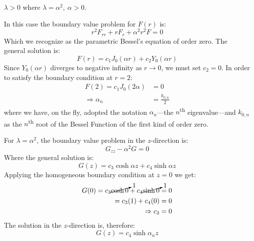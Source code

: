 \vspace{0.25cm}

\noindent\underline{$\lambda > 0 $} where $\lambda = \alpha^2, \ \alpha>0$.

\noindent In this case the boundary value problem for $F(r)$ is:
\begin{equation*}
r^2F_{rr}+rF_r+\alpha^2r^2F = 0
\end{equation*}
Which we recognize as the parametric Bessel's equation of order zero.  The general solution is:
\begin{equation*}
F(r) = c_1J_0(\alpha r) + c_2 Y_0(\alpha r)
\end{equation*}
Since $Y_0(\alpha r)$ diverges to negative infinity as $r \to 0$, we must set $c_2 = 0$.  In order to satisfy the boundary condition at $r=2$:
\begin{align*}
F(2) = c_1J_0(2 \alpha) &= 0 \\
\Rightarrow \alpha_n &= \frac{k_{0,n}}{2}
\end{align*}
where we have, on the fly, adopted the notation $\alpha_n$---the $n$\textsuperscript{th} eigenvalue---and $k_{0,n}$ as the $n$\textsuperscript{th} root of the Bessel Function of the first kind of order zero.

\vspace{0.25cm}

\noindent For $\lambda = \alpha^2$, the boundary value problem in the $z$-direction is:
\begin{equation*}
G_{zz}-\alpha^2G = 0
\end{equation*}
Where the general solution is:
\begin{equation*}
G(z) = c_3\cosh{\alpha z} + c_4\sinh{\alpha z}
\end{equation*}
Applying the homogeneous boundary condition at $z=0$ we get:
\begin{align*}
G(0) = c_3 \cancelto{1}{\cosh{0}} + c_4 \cancelto{1}{\sinh{0}} &= 0 \\
= c_3(1) + c_4(0) &= 0 \\
\Rightarrow c_3 &= 0
\end{align*}
The solution in the $z$-direction is, therefore:
\begin{equation*}
G(z) = c_4 \sinh{\alpha_n z}
\end{equation*}

\vspace{0.25cm}

